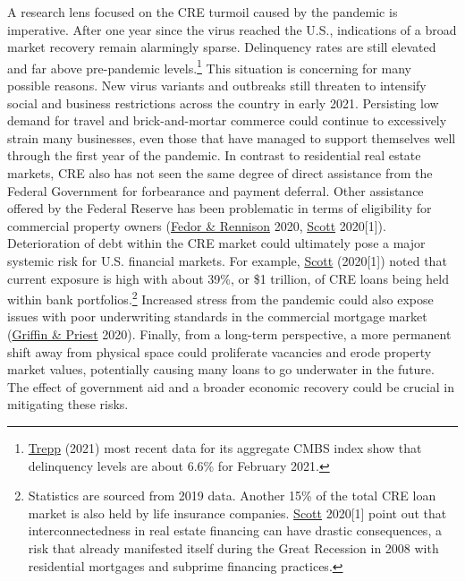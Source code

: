 \documentclass[11pt]{article} %
\begin{document}
A research lens focused on the CRE turmoil caused by the pandemic is imperative. After one year since the virus reached the U.S., indications of a broad market recovery remain alarmingly sparse. Delinquency rates are still elevated and far above pre-pandemic levels.\footnote{\hyperlink{Trepp}{Trepp} (2021) most recent data for its aggregate CMBS index show that delinquency levels are about 6.6\% for February 2021.}  This situation is concerning for many possible reasons. New virus variants and outbreaks still threaten to intensify social and business restrictions across the country in early 2021. Persisting low demand for travel and brick-and-mortar commerce could continue to excessively strain many businesses, even those that have managed to support themselves well through the first year of the pandemic. In contrast to residential real estate markets, CRE also has not seen the same degree of direct assistance from the Federal Government for forbearance and payment deferral. Other assistance offered by the Federal Reserve has been problematic in terms of eligibility for commercial property owners (\hyperlink{Fedor}{Fedor \& Rennison} 2020, \hyperlink{Scott}{Scott} 2020[1]). Deterioration of debt within the CRE market could ultimately pose a major systemic risk for U.S. financial markets. For example, \hyperlink{Scott}{Scott} (2020[1]) noted that current exposure is high with about 39\%, or \$1 trillion, of CRE loans being held within bank portfolios.\footnote{Statistics are sourced from 2019 data. Another 15\% of the total CRE loan market is also held by life insurance companies. \hyperlink{Scott}{Scott} 2020[1] point out that interconnectedness in real estate financing can have drastic consequences, a risk that already manifested itself during the Great Recession in 2008 with residential mortgages and subprime financing practices.} Increased stress from the pandemic could also expose issues with poor underwriting standards in the commercial mortgage market (\hyperlink{Griffin}{Griffin \& Priest} 2020). Finally, from a long-term perspective, a more permanent shift away from physical space could proliferate vacancies and erode property market values, potentially causing many loans to go underwater in the future. The effect of government aid and a broader economic recovery could be crucial in mitigating these risks.
\end{document}
